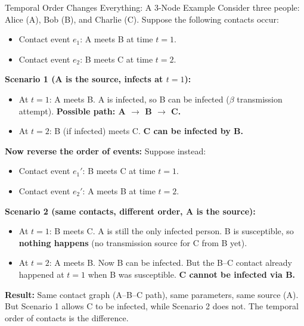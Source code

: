 \begin{examplebox}{Temporal Order Changes Everything: A 3-Node Example}
Consider three people: Alice (A), Bob (B), and Charlie (C). Suppose the following contacts occur:
\begin{itemize}[noitemsep]
    \item Contact event $e_1$: A meets B at time $t = 1$.
    \item Contact event $e_2$: B meets C at time $t = 2$.
\end{itemize}

\textbf{Scenario 1 (A is the source, infects at $t=1$):}
\begin{itemize}[noitemsep]
    \item At $t=1$: A meets B. A is infected, so B can be infected ($\beta$ transmission attempt). \textbf{Possible path: A $\to$ B $\to$ C.}
    \item At $t=2$: B (if infected) meets C. \textbf{C can be infected by B.}
\end{itemize}

\textbf{Now reverse the order of events:} Suppose instead:
\begin{itemize}[noitemsep]
    \item Contact event $e_1'$: B meets C at time $t = 1$.
    \item Contact event $e_2'$: A meets B at time $t = 2$.
\end{itemize}

\textbf{Scenario 2 (same contacts, different order, A is the source):}
\begin{itemize}[noitemsep]
    \item At $t=1$: B meets C. A is still the only infected person. B is susceptible, so \textbf{nothing happens} (no transmission source for C from B yet).
    \item At $t=2$: A meets B. Now B can be infected. But the B--C contact already happened at $t=1$ when B was susceptible. \textbf{C cannot be infected via B.}
\end{itemize}

\textbf{Result:} Same contact graph (A--B--C path), same parameters, same source (A). But Scenario 1 allows C to be infected, while Scenario 2 does not. The temporal order of contacts is the difference.
\end{examplebox}

